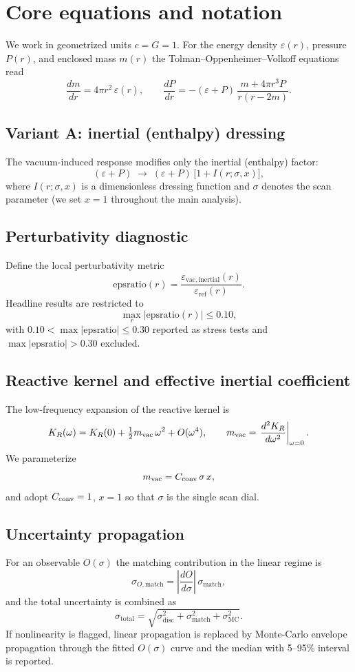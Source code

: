 \section*{Core equations and notation}

We work in geometrized units \(c=G=1\). For the energy density \(\varepsilon(r)\), pressure \(P(r)\), and enclosed mass \(m(r)\) the Tolman--Oppenheimer--Volkoff equations read
\[
\frac{dm}{dr}=4\pi r^{2}\,\varepsilon(r),
\qquad
\frac{dP}{dr}=-(\varepsilon+P)\,\frac{m+4\pi r^{3}P}{r(r-2m)}.
\]

\subsection*{Variant A: inertial (enthalpy) dressing}
The vacuum-induced response modifies only the inertial (enthalpy) factor:
\[
(\varepsilon+P)\;\longrightarrow\;(\varepsilon+P)\,\bigl[1+I(r;\sigma,x)\bigr],
\]
where \(I(r;\sigma,x)\) is a dimensionless dressing function and \(\sigma\) denotes the scan parameter (we set \(x=1\) throughout the main analysis).

\subsection*{Perturbativity diagnostic}
Define the local perturbativity metric
\[
\mathrm{epsratio}(r)=\frac{\varepsilon_{\mathrm{vac,inertial}}(r)}{\varepsilon_{\mathrm{ref}}(r)}.
\]
Headline results are restricted to
\[
\max_{r}|\mathrm{epsratio}(r)| \le 0.10,
\]
with \(0.10<\max|\mathrm{epsratio}|\le 0.30\) reported as stress tests and \(\max|\mathrm{epsratio}|>0.30\) excluded.

\subsection*{Reactive kernel and effective inertial coefficient}
The low-frequency expansion of the reactive kernel is
\[
K_{R}(\omega)=K_{R}(0)+\tfrac{1}{2}m_{\rm vac}\,\omega^{2}+O(\omega^{4}),
\qquad
m_{\rm vac}=\left.\frac{d^{2}K_{R}}{d\omega^{2}}\right|_{\omega=0}.
\]
We parameterize
\[
m_{\rm vac}=C_{\rm conv}\,\sigma\,x,
\]
and adopt \(C_{\rm conv}=1\), \(x=1\) so that \(\sigma\) is the single scan dial.

\subsection*{Uncertainty propagation}
For an observable \(O(\sigma)\) the matching contribution in the linear regime is
\[
\sigma_{O,\mathrm{match}}=\left|\frac{dO}{d\sigma}\right|\,\sigma_{\mathrm{match}},
\]
and the total uncertainty is combined as
\[
\sigma_{\mathrm{total}}=\sqrt{\sigma_{\mathrm{disc}}^{2}+\sigma_{\mathrm{match}}^{2}+\sigma_{\mathrm{MC}}^{2}}.
\]
If nonlinearity is flagged, linear propagation is replaced by Monte-Carlo envelope propagation through the fitted \(O(\sigma)\) curve and the median with 5--95\% interval is reported.
